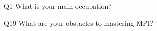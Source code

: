 \begin{description}%
\item{Q1} What is your main occupation?%
\item{Q19} What are your obstacles to mastering MPI?%
\end{description}%
